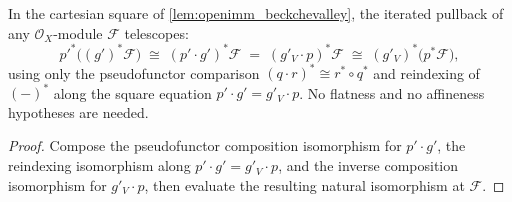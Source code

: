 \begin{lemma}
  \label{lem:openimm_bc_telescope}
  In the cartesian square of \cref{lem:openimm_beckchevalley}, the iterated pullback of any
  \(\mathcal{O}_X\)-module \(\mathcal{F}\) telescopes:
  \[
    p'^*\bigl((g')^*\mathcal{F}\bigr)
      \;\cong\; (p' \cdot g')^*\mathcal{F}
      \;=\; (g'_V \cdot p)^*\mathcal{F}
      \;\cong\; (g'_V)^*\bigl(p^*\mathcal{F}\bigr),
  \]
  using only the pseudofunctor comparison \((q \cdot r)^* \cong r^* \circ q^*\) and reindexing of
  \((-)^*\) along the square equation \(p' \cdot g' = g'_V \cdot p\). No flatness and no
  affineness hypotheses are needed.
\end{lemma}
\begin{proof}
  Compose the pseudofunctor composition isomorphism for \(p' \cdot g'\), the reindexing
  isomorphism along \(p' \cdot g' = g'_V \cdot p\), and the inverse composition isomorphism for
  \(g'_V \cdot p\), then evaluate the resulting natural isomorphism at \(\mathcal{F}\).
\end{proof}

